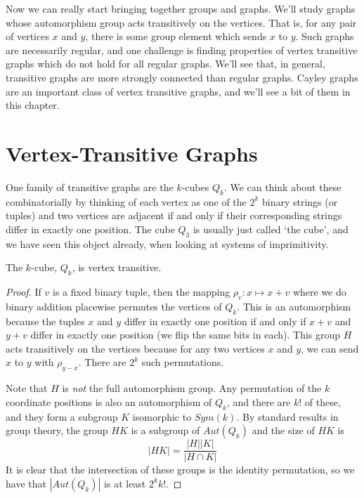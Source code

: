 \renewcommand{\exc}[1]{\subsubsection*{Exercise 3.#1}}




Now we can really start bringing together groups and graphs.  We'll study graphs whose automorphism group acts transitively on the vertices.  That is, for any pair of vertices $x$ and $y$, there is some group element which sends $x$ to $y$.  Such graphs are necessarily regular, and one challenge is finding properties of vertex transitive graphs which do not hold for all regular graphs.  We'll see that, in general, transitive graphs are more strongly connected than regular graphs.  Cayley graphs are an important class of vertex transitive graphs, and we'll see a bit of them in this chapter.



\section*{Vertex-Transitive Graphs}


One family of transitive graphs are the $k$-cubes $Q_k$.  We can think about these combinatorially by thinking of each vertex as one of the $2^k$ binary strings (or tuples) and two vertices are adjacent if and only if their corresponding strings differ in exactly one position.  The cube $Q_3$ is usually just called `the cube', and we have seen this object already, when looking at systems of imprimitivity.

\begin{lemma}
The $k$-cube, $Q_k$, is vertex transitive.
\end{lemma}

\begin{proof}
If $v$ is a fixed binary tuple, then the mapping $\rho_v:x\mapsto x+v$ where we do binary addition placewise permutes the vertices of $Q_k$.  This is an automorphism because the tuples $x$ and $y$ differ in exactly one position if and only if $x+v$ and $y+v$ differ in exactly one position (we flip the same bits in each).  This group $H$ acts transitively on the vertices because for any two vertices $x$ and $y$, we can send $x$ to $y$ with $\rho_{y-x}$. There are $2^k$ such permutations. 

Note that $H$ is \textit{not} the full automorphism group.  Any permutation of the $k$ coordinate positions is also an automorphism of $Q_k$, and there are $k!$ of these, and they form a subgroup $K$ isomorphic to $Sym(k)$.  By standard results in group theory, the group $HK$ is a subgroup of $Aut(Q_k)$ and the size of $HK$ is
$$|HK|=\frac{|H||K|}{|H\cap K|}$$
It is clear that the intersection of these groups is the identity permutation, so we have that $|Aut(Q_k)|$ is at least $2^kk!$. 
\end{proof}

